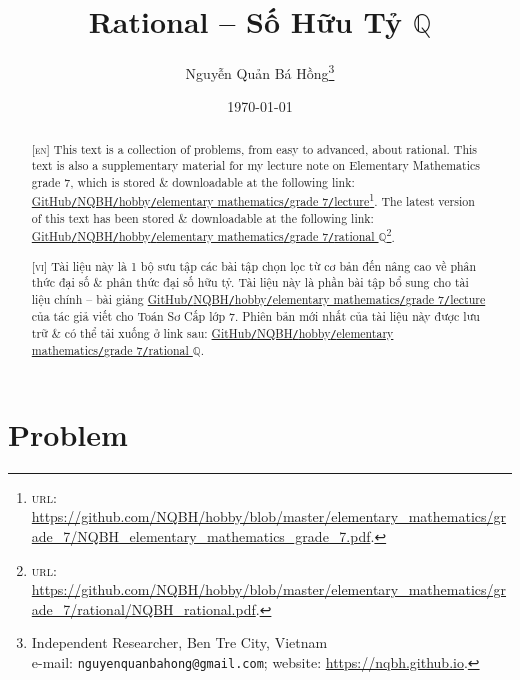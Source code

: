 \documentclass{article}
\title{Rational -- Số Hữu Tỷ $\mathbb{Q}$}
\author{Nguyễn Quản Bá Hồng\footnote{Independent Researcher, Ben Tre City, Vietnam\\e-mail: \texttt{nguyenquanbahong@gmail.com}; website: \url{https://nqbh.github.io}.}}
\date{\today}
\numberwithin{equation}{section}
\begin{document}
\maketitle
\begin{abstract}
	\textsc{[en]} This text is a collection of problems, from easy to advanced, about rational. This text is also a supplementary material for my lecture note on Elementary Mathematics grade 7, which is stored \& downloadable at the following link: \href{https://github.com/NQBH/hobby/blob/master/elementary_mathematics/grade_7/NQBH_elementary_mathematics_grade_7.pdf}{GitHub\texttt{/}NQBH\texttt{/}hobby\texttt{/}elementary mathematics\texttt{/}grade 7\texttt{/}lecture}\footnote{\textsc{url}: \url{https://github.com/NQBH/hobby/blob/master/elementary_mathematics/grade_7/NQBH_elementary_mathematics_grade_7.pdf}.}. The latest version of this text has been stored \& downloadable at the following link: \href{https://github.com/NQBH/hobby/blob/master/elementary_mathematics/grade_7/rational/NQBH_rational.pdf}{GitHub\texttt{/}NQBH\texttt{/}hobby\texttt{/}elementary mathematics\texttt{/}grade 7\texttt{/}rational $\mathbb{Q}$}\footnote{\textsc{url}: \url{https://github.com/NQBH/hobby/blob/master/elementary_mathematics/grade_7/rational/NQBH_rational.pdf}.}.
	\vspace{2mm}
	
	\textsc{[vi]} Tài liệu này là 1 bộ sưu tập các bài tập chọn lọc từ cơ bản đến nâng cao về phân thức đại số \& phân thức đại số hữu tỷ. Tài liệu này là phần bài tập bổ sung cho tài liệu chính -- bài giảng \href{https://github.com/NQBH/hobby/blob/master/elementary_mathematics/grade_7/NQBH_elementary_mathematics_grade_7.pdf}{GitHub\texttt{/}NQBH\texttt{/}hobby\texttt{/}elementary mathematics\texttt{/}grade 7\texttt{/}lecture} của tác giả viết cho Toán Sơ Cấp lớp 7. Phiên bản mới nhất của tài liệu này được lưu trữ \& có thể tải xuống ở link sau: \href{https://github.com/NQBH/hobby/blob/master/elementary_mathematics/grade_7/rational/NQBH_rational.pdf}{GitHub\texttt{/}NQBH\texttt{/}hobby\texttt{/}elementary mathematics\texttt{/}grade 7\texttt{/}rational $\mathbb{Q}$}.
\end{abstract}
\setcounter{secnumdepth}{4}
\setcounter{tocdepth}{3}
\tableofcontents


\section{Problem}
\end{document}
